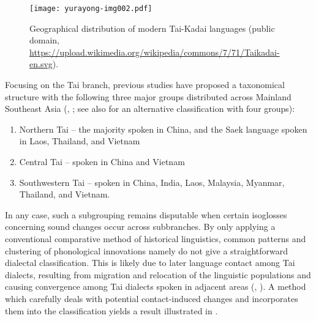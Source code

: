 \documentclass[output=paper]{langscibook}
\begin{document}
\begin{figure}
\texttt{[image: yurayong-img002.pdf]}
\caption{\label{fig:yurayong:2}Geographical distribution of modern Tai-Kadai languages (public domain, \url{https://upload.wikimedia.org/wikipedia/commons/7/71/Taikadai-en.svg}).}
\end{figure}


Focusing on the Tai branch, previous studies have proposed a taxonomical structure with the following three major groups distributed across Mainland Southeast Asia (\citealt{Chamberlain1975}, \citealt{Li1977}; see also \citealt{Luo1997} for an alternative classification with four groups):

\begin{enumerate}
\item Northern Tai – the majority spoken in China, and the Saek language spoken in Laos, Thailand, and Vietnam
\item Central Tai – spoken in China and Vietnam
\item Southwestern Tai – spoken in China, India, Laos, Malaysia, Myanmar, Thailand, and Vietnam.
\end{enumerate}

In any case, such a subgrouping remains disputable when certain isoglosses concerning sound changes occur across subbranches. By only applying a conventional comparative method of historical linguistics, common patterns and clustering of phonological innovations namely do not give a straightforward dialectal classification. This is likely due to later language contact among Tai dialects, resulting from migration and relocation of the linguistic populations and causing convergence among Tai dialects spoken in adjacent areas (\citealt{Pittayaporn2009}, \citealt{Liao2023b}). A method which carefully deals with potential contact-induced changes and incorporates them into the classification yields a result illustrated in .
\end{document}
